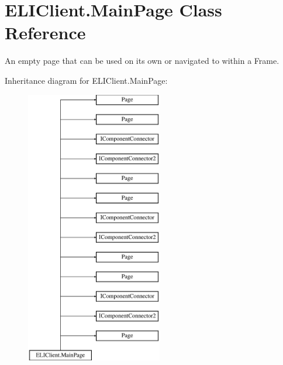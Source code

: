 \hypertarget{class_e_l_i_client_1_1_main_page}{}\section{E\+L\+I\+Client.\+Main\+Page Class Reference}
\label{class_e_l_i_client_1_1_main_page}


An empty page that can be used on its own or navigated to within a Frame.  


Inheritance diagram for E\+L\+I\+Client.\+Main\+Page\+:\begin{figure}[H]
\begin{center}
\leavevmode
\includegraphics[height=12.000000cm]{d1/d6f/class_e_l_i_client_1_1_main_page}
\end{center}
\end{figure}
